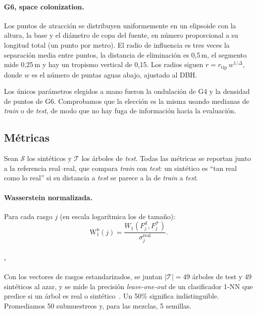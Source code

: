 \documentclass[11pt,a4paper]{article}
\newcommand{\Wn}{\mathrm{W}_1^{\mathrm{n}}}
\newcommand{\NNA}{\text{1-NNA}}
\begin{document}
\paragraph{G6, space colonization.} Los puntos de atracción se distribuyen uniformemente en un elipsoide con la altura, la base y el diámetro de copa del fuente, en número proporcional a su longitud total (un punto por metro). El radio de influencia es tres veces la separación media entre puntos, la distancia de eliminación es 0,5\,m, el segmento mide 0,25\,m y hay un tropismo vertical de 0,15. Los radios siguen $r = r_{\text{tip}}\,w^{1/\Delta}$, donde $w$ es el número de puntas aguas abajo, ajustado al DBH.

Los únicos parámetros elegidos a mano fueron la ondulación de G4 y la densidad de puntos de G6. Comprobamos que la elección es la misma usando medianas de \emph{train} o de \emph{test}, de modo que no hay fuga de información hacia la evaluación.

\subsection{Métricas}
Sean $\mathcal{S}$ los sintéticos y $\mathcal{T}$ los árboles de \emph{test}. Todas las métricas se reportan junto a la referencia real--real, que compara \emph{train} con \emph{test}: un sintético es \enquote{tan real como lo real} si su distancia a \emph{test} se parece a la de \emph{train} a \emph{test}.

\paragraph{Wasserstein normalizada.} Para cada rasgo $j$ (en escala logarítmica los de tamaño):
\begin{equation}
\Wn(j) = \frac{W_1\!\left(F_j^{\mathcal{S}}, F_j^{\mathcal{T}}\right)}{\sigma_j^{\text{real}}}.
\end{equation}

\paragraph{\NNA.} Con los vectores de rasgos estandarizados, se juntan $|\mathcal{T}|=49$ árboles de test y 49 sintéticos al azar, y se mide la precisión \emph{leave-one-out} de un clasificador 1-NN que predice si un árbol es real o sintético~\cite{lopezpaz2017c2st,yang2019pointflow}. Un 50\% significa indistinguible. Promediamos 50 submuestreos y, para las mezclas, 5 semillas.
\end{document}

